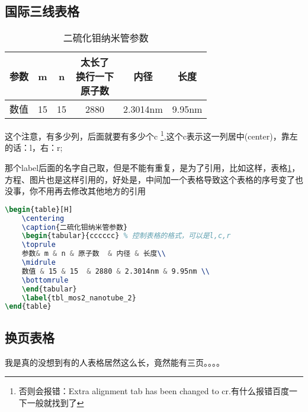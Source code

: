 \documentclass[AutoFakeBold]{LZUThesis}
\begin{document}
\subsection{国际三线表格} %
\label{sub:国际三线表格}

\begin{table}[H]
    \centering
    \caption{二硫化钼纳米管参数}
    \begin{tabular}{cccccc} %
    \toprule
    参数& m & n & \tabincell{c}{太长了\\换行一下\\原子数}  & 内径 & 长度\\
    \midrule
    数值 & 15 & 15  & 2880 & 2.3014nm & 9.95nm \\
    \bottomrule
    \end{tabular}
    \label{tbl_mos2_nanotube}
\end{table}

这个注意，有多少列，后面就要有多少个c \footnote{否则会报错：Extra alignment tab has been changed to cr.有什么报错百度一下一般就找到了},这个c表示这一列居中(center)，靠左的话：l，右：r;

那个label后面的名字自己取，但是不能有重复，是为了引用，比如这样，表格\ref{tbl_mos2_nanotube}，方程、图片也是这样引用的，好处是，中间加一个表格导致这个表格的序号变了也没事，你不用再去修改其他地方的引用

\begin{lstlisting}[language = tex]
\begin{table}[H]
    \centering
    \caption{二硫化钼纳米管参数}
    \begin{tabular}{cccccc} % 控制表格的格式，可以是l,c,r
    \toprule
    参数& m & n & 原子数  & 内径 & 长度\\
    \midrule
    数值 & 15 & 15  & 2880 & 2.3014nm & 9.95nm \\
    \bottomrule
    \end{tabular}
    \label{tbl_mos2_nanotube_2}
\end{table}
\end{lstlisting}

\subsection{换页表格} %

我是真的没想到有的人表格居然这么长，竟然能有三页。。。。
\end{document}
